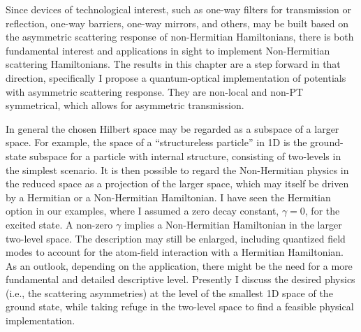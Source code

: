 Since devices of technological interest, such as one-way filters for transmission or reflection, one-way barriers, one-way mirrors, and others, may be built based on the asymmetric scattering response of non-Hermitian Hamiltonians, there is both fundamental
interest and applications in sight to implement Non-Hermitian scattering Hamiltonians. The results in this chapter are a step forward in that direction, specifically I propose a quantum-optical implementation of potentials with asymmetric scattering response.
They are non-local and non-PT symmetrical, which allows for asymmetric transmission.

In general the chosen Hilbert space may  be regarded as a subspace of a larger space. For example,  the space of a ``structureless particle'' in 1D is the ground-state subspace
for a particle with internal structure, consisting of two-levels in the simplest scenario.
It is then possible to regard the Non-Hermitian physics in the reduced space
as a projection of the larger space, which may itself be driven by a  Hermitian or a Non-Hermitian Hamiltonian.
I have seen the Hermitian option in our examples, where I assumed a zero decay constant, $\gamma=0$, for the excited state.
A non-zero $\gamma$ implies  a Non-Hermitian  Hamiltonian in the larger two-level space. The description may still be
enlarged,  including  quantized field modes to account for the atom-field interaction with a Hermitian Hamiltonian.
As an outlook, depending on the application, there might be the need for a more fundamental and detailed descriptive level. Presently I discuss the desired physics (i.e., the scattering asymmetries) at the level of the smallest 1D space of the ground state, while taking refuge in the
two-level space to find a feasible physical implementation.
